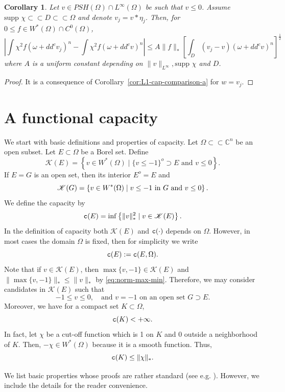 \documentclass{amsart}
\newcommand{\om}{\omega}
\newcommand{\tc}{{\tt c}}
\newcommand{\Om}{\Omega}
\newcommand{\supp}{\mbox{supp }}
\newcommand{\bC}{\mathbb{C}}
\newcommand{\cali}[1]{\mathscr{#1}}
\newcommand{\Kc}{\cali{K}}
\newtheorem{cor}[thm]{Corollary}
\theoremstyle{definition}
\numberwithin{thm}{section}
\numberwithin{equation}{section}
\renewcommand{\[}{\begin{equation}}
\renewcommand{\]}{\end{equation}}
\newcommand{\rv}{\;\rvert\;}
\begin{document}
\begin{cor}\label{cor:L1-cap-comparison-b} Let $v\in PSH(\Om)\cap L^\infty(\Om)$ be such that $v\leq 0$. Assume $\supp\chi \subset \subset D \subset \subset \Om$ and denote $v_j = v*\eta_j$. Then, for $0\leq f \in W^*(\Om)\cap C^0(\Om)$,
$$
	\left| \int \chi^2 f (\om+ dd^c v_j)^n -\int \chi^2 f (\om+ dd^c v)^n \right| \leq  A \|f\|_* \left[\int_{D} (v_j -v) (\om+ dd^c v)^n\right]^\frac{1}{2}
$$
where $A$ is a uniform constant depending on $\|v\|_{L^\infty}, \supp\chi$ and $D$. 
\end{cor}

\begin{proof} It is a consequence of Corollary~\ref{cor:L1-cap-comparison-a} for $w= v_j$.
\end{proof}

\section{A functional capacity}


We start with basic definitions and properties of capacity. Let $\Om \subset \subset \bC^n$ be an open subset.   Let $E \subset \Om$ be a Borel set. Define
 \[\label{eq:ke-cap}
 	\Kc(E) = \left\{ v \in W^*(\Om) \rv \{v \leq  -1\}^o \supset E \text{ and } v\leq 0 \right\}.
\]
If $E=G$ is an open set, then its interior $E^o = E$ and 
\[\notag
		\Kc(G) = \left\{ v \in W^*(\Om) \;\rvert\; v \leq  -1 \text{ in $G$ and } v\leq 0 \right\}.
\]
We define the capacity by
\[\label{eq:cap-defn}
	{\tt c}(E) = \inf 
	\left\{ \| v \|_*^2 \;\rvert\;  v\in \Kc(E)
	\right\}.
\] 
In the definition of capacity both $\Kc(E)$ and $\tc(\cdot)$ depends on $\Om$. However, in most cases the domain $\Om$ is fixed, then for simplicity we write
$$
		\tc(E) := \tc(E,\Om).
$$
Note that if $v \in \Kc(E)$, then $\max\{v,-1\}\in \Kc(E)$ and$ \|\max\{v, -1\} \|_* \leq \|v\|_*$ by  \eqref{eq:norm-max-min}. Therefore, we may consider candidates  in $\Kc(E)$ such that 
\[ \label{eq:reduction} 
	-1\leq v \leq 0, \quad \text{and } v=-1  \text{ on an open set } G\supset E.
\] Moreover, we have for a compact set $K \subset \Om$, 
\[ \label{eq:c-compact} \tc(K) <+\infty.
\] In fact, let $\chi$ be a cut-off function which is 1 on $K$ and $0$ outside a neighborhood of $K$. Then, $-\chi \in W^*(\Om)$ because it is a smooth function. Thus,
$$
	\tc (K) \leq \| \chi \|_*.
$$

We list basic properties whose proofs are rather standard (see e.g. \cite{AH96}). However, we include the details for the reader convenience. 
\end{document}
